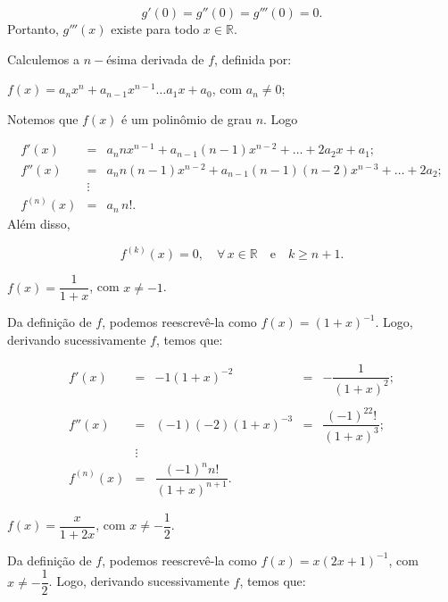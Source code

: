\cleardoublepage\documentclass[../main.tex]{subfiles}
\begin{document}
\begin{exeresol}
\begin{resol}
\begin{compactenum}[a.]
\[ g'(0)=g''(0)=g'''(0)=0. \]
Portanto, \(g'''(x)\) existe para todo \(x \in \mathbb{R}\).
    \end{compactenum}
\end{resol}
\end{exeresol}

\begin{exeresol}
  Calculemos a \(n-\)ésima derivada de \(f\), definida por:
  \begin{compactenum}[a)]
    \item \(f(x)=a_nx^n+a_{n-1}x^{n-1}\dots a_1x+a_0\), com \(a_n\neq 0\);
    
    \begin{resol}
        Notemos que \(f(x)\) é um polinômio de grau \(n\). Logo

\[ \begin{array}{rcl} f'(x)&=&a_nnx^{n-1}+a_{n-1}(n-1)x^{n-2}+\dots+ 2a_2x+ a_1;\\ f''(x)&=&a_nn(n-1)x^{n-2}+a_{n-1}(n-1)(n-2)x^{n-3}+\dots+ 2a_2;\\ &\vdots&\\ f^{(n)}(x)&=&a_n\,n!. \end{array} \]
Além disso,

\[ f^{(k)}(x)=0,\quad \forall\, x \in \mathbb{R} \quad \mbox{e} \quad k\geq n+1. \]
    \end{resol}
    \item \(f(x)=\dfrac{1}{1+x}\), com \(x\neq -1\).
    
    \begin{resol}
        Da definição de \(f\), podemos reescrevê-la como \(f(x)=(1+x)^{-1}\). Logo, derivando sucessivamente \(f\), temos que:

\[ \begin{array}{rclllll} f'(x)&=&-1(1+x)^{-2}&=&-\dfrac{1}{(1+x)^2} ;\\ \\ f''(x)&=&(-1)(-2)(1+x)^{-3}&=&\dfrac{(-1)^22!}{(1+x)^3};\\ &\vdots&\\ f^{(n)}(x)&=&\dfrac{(-1)^nn!}{(1+x)^{n+1}}. \end{array} \]
    \end{resol}
    \item \(f(x)=\dfrac{x}{1+2x}\), com \(x\neq -\dfrac{1}{2} \).
    
    \begin{resol}
        Da definição de \(f\), podemos reescrevê-la como \(f(x)=x(2x+1)^{-1}\), com \(x\neq -\dfrac{1}{2} \). Logo, derivando sucessivamente \(f\), temos que:


\end{resol}
\end{compactenum}
\end{exeresol}
\end{document}
